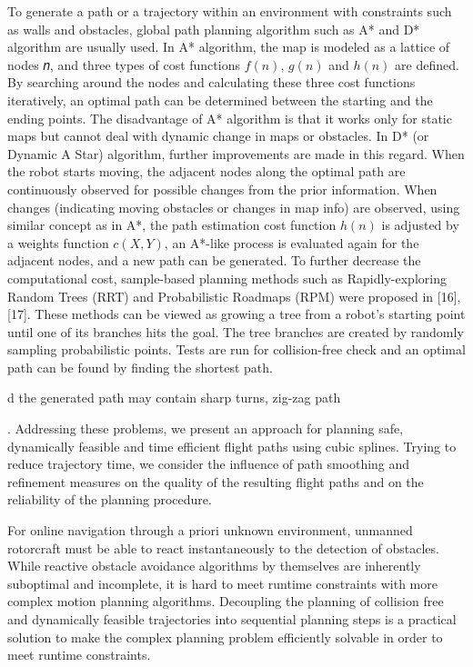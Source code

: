 \documentclass[a4paper]{report}
\begin{document}
To generate a path or a trajectory within an environment with
constraints such as walls and obstacles, global path planning
algorithm such as A* and D* algorithm are usually used. In A*
algorithm, the map is modeled as a lattice of nodes 𝑛, and three
types of cost functions $f(n)$, $g(n)$ and $h(n)$ are defined. By
searching around the nodes and calculating these three cost
functions iteratively, an optimal path can be determined between
the starting and the ending points. The disadvantage of A*
algorithm is that it works only for static maps but cannot deal
with dynamic change in maps or obstacles. In D* (or Dynamic
A Star) algorithm, further improvements are made in this regard.
When the robot starts moving, the adjacent nodes along the
optimal path are continuously observed for possible changes
from the prior information. When changes (indicating moving
obstacles or changes in map info) are observed, using similar
concept as in A*, the path estimation cost function $h(n)$ is
adjusted by a weights function $c(X,Y)$, an A*-like process is
evaluated again for the adjacent nodes, and a new path can be
generated.
To further decrease the computational cost, sample-based
planning methods such as Rapidly-exploring Random Trees
(RRT) and Probabilistic Roadmaps (RPM) were proposed in
[16], [17]. These methods can be viewed as growing a tree from
a robot's starting point until one of its branches hits the goal. The
tree branches are created by randomly sampling probabilistic
points. Tests are run for collision-free check and an optimal path
can be found by finding the shortest path.

d the generated path may contain sharp turns,
zig-zag path

. Addressing these problems, we present an
approach for planning safe, dynamically feasible and time
efficient flight paths using cubic splines. Trying to reduce
trajectory time, we consider the influence of path smoothing
and refinement measures on the quality of the resulting flight
paths and on the reliability of the planning procedure.

For online navigation through a priori unknown environment,
unmanned rotorcraft must be able to react instantaneously
to the detection of obstacles. While reactive obstacle
avoidance algorithms by themselves are inherently suboptimal
and incomplete, it is hard to meet runtime constraints
with more complex motion planning algorithms. Decoupling
the planning of collision free and dynamically feasible trajectories
into sequential planning steps is a practical solution
to make the complex planning problem efficiently solvable
in order to meet runtime constraints. 
\end{document}
